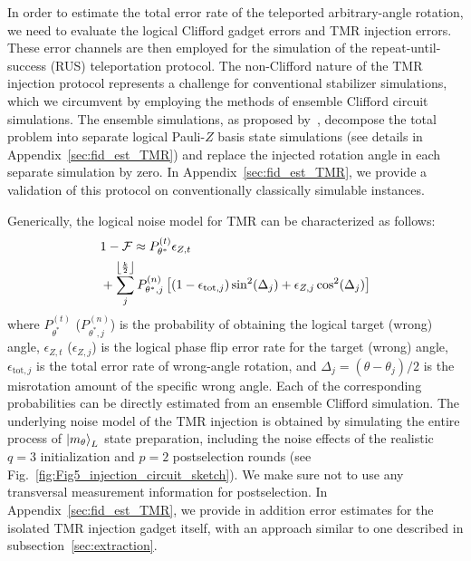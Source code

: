 \documentclass[aps, prx, reprint, superscriptaddress, longbibliography, floatfix]{revtex4-2}
\begin{document}
In order to estimate the total error rate of the teleported arbitrary-angle rotation, we need to evaluate the logical Clifford gadget errors and TMR injection errors. These error channels are then employed for the simulation of the repeat-until-success (RUS) teleportation protocol. The non-Clifford nature of the TMR injection protocol represents a challenge for conventional stabilizer simulations, which we circumvent by employing the methods of ensemble Clifford circuit simulations. The ensemble simulations, as proposed by~\cite{Choi2023,Toshio2024}, decompose the total problem into separate logical Pauli-$Z$ basis state simulations (see details in Appendix~\ref{sec:fid_est_TMR}) and replace the injected rotation angle in each separate simulation by zero. In Appendix~\ref{sec:fid_est_TMR}, we provide a validation of this protocol on conventionally classically simulable instances. 


Generically, the logical noise model for TMR can be characterized as follows: 
\begin{align}
\label{eq:inf_2}
      &1-\mathcal{F}  \approx P^{(t)}_{\theta^*} \epsilon_{Z,t}\\ 
      &+\sum_j^{\left \lfloor\frac{k}{2}\right \rfloor} P^{(n)}_{\theta^*,j}\left [ (1-\epsilon_{\text{tot},j})\sin^2(\Delta_j)+\epsilon_{Z,j}\cos^2(\Delta_j)\right ]\notag
\end{align}
where $P^{(t)}_{\theta^*}$ ($P^{(n)}_{\theta^*,j}$) is the probability of obtaining the logical target (wrong) angle, $\epsilon_{Z,t}$ ($\epsilon_{Z,j}$) is the logical phase flip error rate for the target (wrong) angle, $\epsilon_{\text{tot},j}$ is the total error rate of wrong-angle rotation, and $\Delta_j=(\theta-\theta_j)/2$ is the misrotation amount of the specific wrong angle. Each of the corresponding probabilities can be directly estimated from an ensemble Clifford simulation. The underlying noise model of the TMR injection is obtained by simulating the entire process of $\ket{m_\theta}_L$ state preparation, including the noise effects of the realistic $q=3$ initialization and $p=2$ postselection rounds (see Fig.~\ref{fig:Fig5_injection_circuit_sketch}). We make sure not to use any transversal measurement information for postselection. In Appendix~\ref{sec:fid_est_TMR}, we provide in addition error estimates for the isolated TMR injection gadget itself, with an approach similar to one described in subsection~\ref{sec:extraction}.
\end{document}
